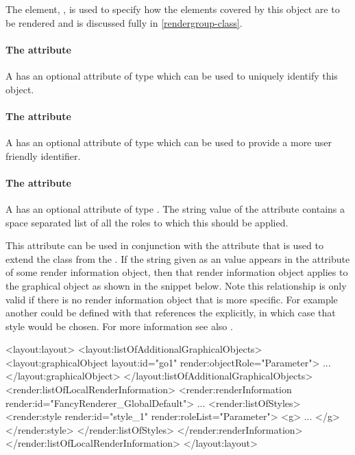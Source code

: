 The \RenderGroup element, , is used to specify how the elements covered by this \Style object are to be rendered and is discussed fully in \ref{rendergroup-class}. 

\paragraph{The \fixttspace{} attribute}

A \Style has an optional attribute  of type  which can be used to uniquely identify this \Style object.

\paragraph{The \fixttspace{} attribute}

A \Style has an optional attribute  of type
 which can be used to provide a more user friendly identifier.

\paragraph{The \fixttspace{} attribute}

A \Style has an optional attribute  of type
. The string value of the  attribute contains 
a space separated list of all the roles to which this \Style should be applied.

This attribute can be  used in conjunction with the  attribute 
that is used to extend the \GraphicalObject class from the \LayoutPackage. If 
the string given as an  value appears in the  
attribute of some render information object, then that render information object
applies to the graphical object as shown in the snippet below. Note this 
relationship is only valid if there is no render information object that is more 
specific. For example another \LocalStyle could be defined with  
that references the  explicitly, in which case that style 
would be  chosen. For more information see also . 

{\footnotesize
\begin{example}
<layout:layout>
   <layout:listOfAdditionalGraphicalObjects>
      <layout:graphicalObject layout:id="go1" render:objectRole="Parameter">
         ...
      </layout:graphicalObject>
   </layout:listOfAdditionalGraphicalObjects>
   <render:listOfLocalRenderInformation>
      <render:renderInformation render:id="FancyRenderer_GlobalDefault">
             ...
        <render:listOfStyles>
             <render:style render:id="style_1" render:roleList="Parameter">
                <g> ... </g>
             </render:style> 
        </render:listOfStyles>
      </render:renderInformation>
   </render:listOfLocalRenderInformation>
</layout:layout>
\end{example}
}


